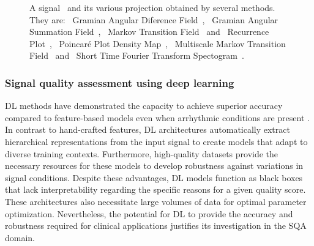 \documentclass[final,3p,times,twocolumn]{elsarticle}
\begin{document}
{\begin{figure}[ht!]
       \caption[A signal and its various projection obtained by several methods.]{
           A signal~ and its various projection obtained by several methods. They are: 
           ~Gramian Angular Diference Field~\cite{gaf-mtf-1}, 
           ~Gramian Angular Summation Field~\cite{gaf-mtf-1}, 
           ~Markov Transition Field~\cite{gaf-mtf-1} and 
           ~Recurrence Plot~\cite{rp-1}, 
           ~Poincaré Plot Density Map~\cite{ecg-6}, 
           ~Multiscale Markov Transition Field~\cite{imaging-6} and 
           ~Short Time Fourier Transform Spectogram~\cite{STFT, imaging-1}.
       }
        \label{fig:literature_projections}
\end{figure}
}


\subsubsection{Signal quality assessment using deep learning}
\label{sec:deep_learning}

\gls{DL} methods have demonstrated the capacity to achieve superior accuracy compared to feature-based models even when arrhythmic conditions are present \cite{arrhythmia-3}.
In contrast to hand-crafted features, \gls{DL} architectures automatically extract hierarchical representations from the input signal to create models that adapt to diverse training contexts.
Furthermore, high-quality datasets provide the necessary resources for these models to develop robustness against variations in signal conditions.
Despite these advantages, \gls{DL} models function as black boxes that lack interpretability regarding the specific reasons for a given quality score.
These architectures also necessitate large volumes of data for optimal parameter optimization.
Nevertheless, the potential for \gls{DL} to provide the accuracy and robustness required for clinical applications justifies its investigation in the \gls{SQA} domain.
\end{document}
